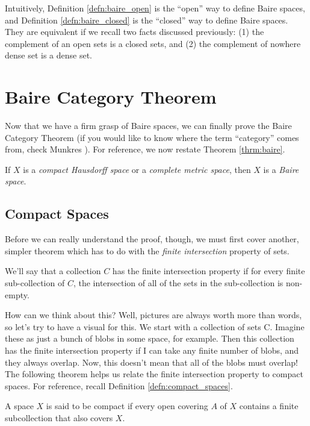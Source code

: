 \documentclass[english, 11pt]{article}
\begin{document}
  Intuitively, Definition \ref{defn:baire_open} is the ``open'' way to define Baire spaces, and Definition \ref{defn:baire_closed} is the ``closed'' way to define Baire spaces. They are equivalent if we recall two facts discussed previously: (1) the complement of an open sets is a closed sets, and (2) the complement of nowhere dense set is a dense set.

  \section{Baire Category Theorem}
  Now that we have a firm grasp of Baire spaces, we can finally prove the Baire Category Theorem (if you would like to know where the term ``category'' comes from, check Munkres \cite{topology_book}).
  For reference, we now restate Theorem \ref{thrm:baire}.
  \begin{thrm}
    \label{thrm:baire2}
  If $X$ is a \textit{compact Hausdorff space} or a \textit{complete metric space}, then $X$ is a \textit{Baire space}.
  \end{thrm}

  \subsection{Compact Spaces}
  Before we can really understand the proof, though, we must first cover another, simpler theorem which has to do with the \textit{finite intersection} property of sets.
  \begin{defn}
  We'll say that a collection $C$ has the finite intersection property if for every finite sub-collection of $C$, the intersection of all of the sets in the sub-collection is non-empty.
  \end{defn}

  How can we think about this? Well, pictures are always worth more than words, so let's try to have a visual for this. We start with a collection of sets C. Imagine these as just a bunch of blobs in some space, for example. Then this collection has the finite intersection property if I can take any finite number of blobs, and they always overlap. Now, this doesn't mean that all of the blobs must overlap! \\

  The following theorem helps us relate the finite intersection property to compact spaces. For reference, recall Definition \ref{defn:compact_spaces}.

  \begin{defn}
  \label{defn:compact_spaces}
  A space $X$ is said to be compact if every open covering $A$ of $X$ contains a finite subcollection that also covers $X$.
  \end{defn}
\end{document}

